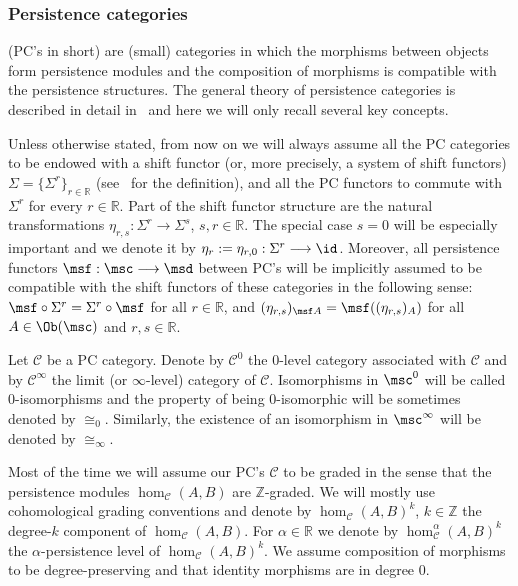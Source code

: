 \subsubsection{Persistence categories} \label{sb:pc} (PC's in
short) are (small) categories in which the morphisms between objects form
persistence modules and the composition of morphisms is compatible
with the persistence structures. The general theory of persistence
categories is described in detail in~\cite[Section~2]{BCZ:tpc} and
here we will only recall several key concepts.

Unless otherwise stated, from now on we will always assume all the PC
categories to be endowed with a shift functor (or, more precisely, a
system of shift functors) $\Sigma = \{\Sigma^r\}_{r \in \mathbb{R}}$
(see~\cite[Section~2.2.3]{BCZ:tpc} for the definition), and all the PC
functors to commute with $\Sigma^r$ for every $r \in \mathbb{R}$. Part
of the shift functor structure are the natural transformations
  $\eta_{r,s}: \Sigma^r \longrightarrow \Sigma^s$,
  $s, r \in \mathbb{R}$.  The special case $s=0$ will be especially
  important and we denote it by
  $\eta_r := \eta_{r,0}: \Sigma^r \longrightarrow \id$.
Moreover, all persistence functors
  $\msf: \msc \longrightarrow \msd$ between PC's will be implicitly
  assumed to be compatible with the shift functors of these categories
  in the following sense: $\msf \circ \Sigma^r = \Sigma^r \circ \msf$
  for all $r \in \mathbb{R}$, and
  $(\eta_{r,s})_{\msf A} = \msf ((\eta_{r,s})_A)$ for all
  $A \in \Ob(\msc)$ and $r, s \in \mathbb{R}$.

Let $\mathscr{C}$ be a PC category. Denote by $\mathscr{C}^0$ the
$0$-level category associated with $\mathscr{C}$ and by
$\mathscr{C}^{\infty}$ the limit (or $\infty$-level) category of
$\mathscr{C}$. Isomorphisms in $\msc^0$ will be called 
$0$-isomorphisms and the property of being $0$-isomorphic will be 
sometimes denoted by $\cong_0$. Similarly, the existence of an isomorphism 
in $\msc^{\infty}$ will be denoted by $\cong_{\infty}$.

Most of the time we will assume our PC's $\mathscr{C}$ to be graded in
the sense that the persistence modules $\hom_{\mathscr{C}}(A,B)$ are
$\mathbb{Z}$-graded. We will mostly use cohomological grading
conventions and denote by $\hom_{\mathscr{C}}(A,B)^k$,
$k \in \mathbb{Z}$ the degree-$k$ component of
$\hom_{\mathscr{C}}(A,B)$. For $\alpha \in \mathbb{R}$ we denote by
$\hom^{\alpha}_{\mathscr{C}}(A,B)^k$ the $\alpha$-persistence level of
$\hom_{\mathscr{C}}(A,B)^k$. We assume composition of morphisms
to be degree-preserving and that identity morphisms are in degree $0$.

